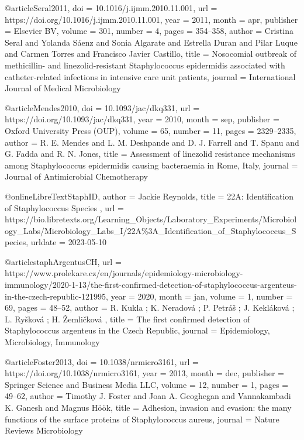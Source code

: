 @article{Seral2011,
  doi = {10.1016/j.ijmm.2010.11.001},
  url = {https://doi.org/10.1016/j.ijmm.2010.11.001},
  year = {2011},
  month = apr,
  publisher = {Elsevier {BV}},
  volume = {301},
  number = {4},
  pages = {354--358},
  author = {Cristina Seral and Yolanda S{\'{a}}enz and Sonia Algarate and Estrella Duran and Pilar Luque and Carmen Torres and Francisco Javier Castillo},
  title = {Nosocomial outbreak of methicillin- and linezolid-resistant Staphylococcus epidermidis associated with catheter-related infections in intensive care unit patients},
  journal = {International Journal of Medical Microbiology}
}

@article{Mendes2010,
  doi = {10.1093/jac/dkq331},
  url = {https://doi.org/10.1093/jac/dkq331},
  year = {2010},
  month = sep,
  publisher = {Oxford University Press ({OUP})},
  volume = {65},
  number = {11},
  pages = {2329--2335},
  author = {R. E. Mendes and L. M. Deshpande and D. J. Farrell and T. Spanu and G. Fadda and R. N. Jones},
  title = {Assessment of linezolid resistance mechanisms among Staphylococcus epidermidis causing bacteraemia in Rome,  Italy},
  journal = {Journal of Antimicrobial Chemotherapy}
}

@online{LibreTextStaphID,
  author = {Jackie Reynolds},
  title = { 22A: Identification of Staphylococcus Species },
  url = {https://bio.libretexts.org/Learning\_Objects/Laboratory\_Experiments/Microbiology\_Labs/Microbiology\_Labs\_I/22A\%3A\_Identification\_of\_Staphylococcus\_Species},
  urldate = {2023-05-10}
}

@article{staphArgentusCH,
  url = {https://www.prolekare.cz/en/journals/epidemiology-microbiology-immunology/2020-1-13/the-first-confirmed-detection-of-staphylococcus-argenteus-in-the-czech-republic-121995},
  year = {2020},
  month = jan,
  volume = {1},
  number = {69},
  pages = {48--52},
  author = {R. Kukla ;  K. Neradová ;  P. Petráš ; J. Kekláková ;  L. Ryšková ;  H. Žemličková },
  title = {The first confirmed detection of Staphylococcus argenteus in the Czech Republic},
  journal = {Epidemiology, Microbiology, Immunology}
}


@article{Foster2013,
  doi = {10.1038/nrmicro3161},
  url = {https://doi.org/10.1038/nrmicro3161},
  year = {2013},
  month = dec,
  publisher = {Springer Science and Business Media {LLC}},
  volume = {12},
  number = {1},
  pages = {49--62},
  author = {Timothy J. Foster and Joan A. Geoghegan and Vannakambadi K. Ganesh and Magnus H\"{o}\"{o}k},
  title = {Adhesion,  invasion and evasion: the many functions of the surface proteins of Staphylococcus aureus},
  journal = {Nature Reviews Microbiology}
}

